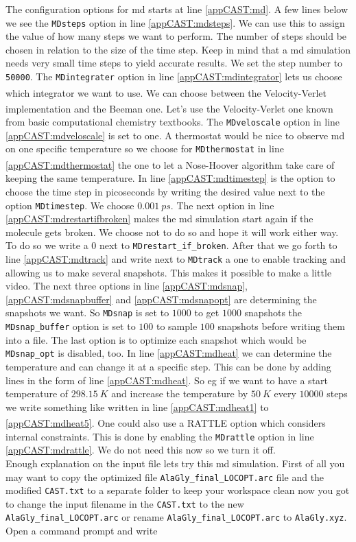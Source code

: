 \documentclass[a4paper,11pt]{scrartcl}
\newcommand{\myCite}[1]{\textsuperscript{\cite{#1}}}
\begin{document}
The configuration options for \ac{md} starts at line \ref{appCAST:md}. A few lines below we see the \texttt{MDsteps} option in line \ref{appCAST:mdsteps}. We can use this to assign the value of how many steps we want to perform. The number of steps should be chosen in relation to the size of the time step. Keep in mind that a \ac{md} simulation needs very small time steps to yield accurate results. We set the step number to \texttt{50000}. The \texttt{MDintegrater} option in line \ref{appCAST:mdintegrator} lets us choose which integrator we want to use. We can choose between the Velocity-Verlet\myCite{VelVer} implementation and the Beeman\myCite{Beeman} one. Let's use the Velocity-Verlet one known from basic computational chemistry textbooks. The \texttt{MDveloscale} option in line \ref{appCAST:mdveloscale} is set to one. A thermostat would be nice to observe \ac{md} on one specific temperature so we choose for \texttt{MDthermostat} in line \ref{appCAST:mdthermostat} the one to let a Nose-Hoover\myCite{NoseHoover} algorithm take care of keeping the same temperature. In line \ref{appCAST:mdtimestep} is the option to choose the time step in picoseconds by writing the desired value next to the option \texttt{MDtimestep}. We choose $0.001~ps$. The next option in line \ref{appCAST:mdrestartifbroken} makes the \ac{md} simulation start again if the molecule gets broken. We choose not to do so and hope it will work either way. To do so we write a $0$ next to \texttt{MDrestart\_if\_broken}. After that we go forth to line \ref{appCAST:mdtrack} and write next to \texttt{MDtrack} a one to enable tracking and allowing us to make several snapshots. This makes it possible to make a little video. The next three options in line \ref{appCAST:mdsnap}, \ref{appCAST:mdsnapbuffer} and \ref{appCAST:mdsnapopt} are determining the snapshots we want. So \texttt{MDsnap} is set to $1000$ to get $1000$ snapshots the \texttt{MDsnap\_buffer} option is set to $100$ to sample $100$ snapshots before writing them into a file. The last option is to optimize each snapshot which would be \texttt{MDsnap\_opt} is disabled, too. In line \ref{appCAST:mdheat} we can determine the temperature and can change it at a specific step. This can be done by adding lines in the form of line \ref{appCAST:mdheat}. So \ac{eg} if we want to have a start temperature of $298.15~K$ and increase the temperature by $50~K$ every $10000$ steps we write something like written in line \ref{appCAST:mdheat1} to \ref{appCAST:mdheat5}. One could also use a RATTLE\myCite{RATTLE} option which considers internal constraints. This is done by enabling the \texttt{MDrattle} option in line \ref{appCAST:mdrattle}. We do not need this now so we turn it off.%
\\
Enough explanation on the input file lets try this \ac{md} simulation. First of all you may want to copy the optimized file \texttt{AlaGly\_final\_LOCOPT.arc} file and the modified \texttt{CAST.txt} to a separate folder to keep your workspace clean now you got to change the input filename in the \texttt{CAST.txt} to the new \texttt{AlaGly\_final\_LOCOPT.arc} or rename \texttt{AlaGly\_final\_LOCOPT.arc} to \texttt{AlaGly.xyz}. Open a command prompt and write
\end{document}
